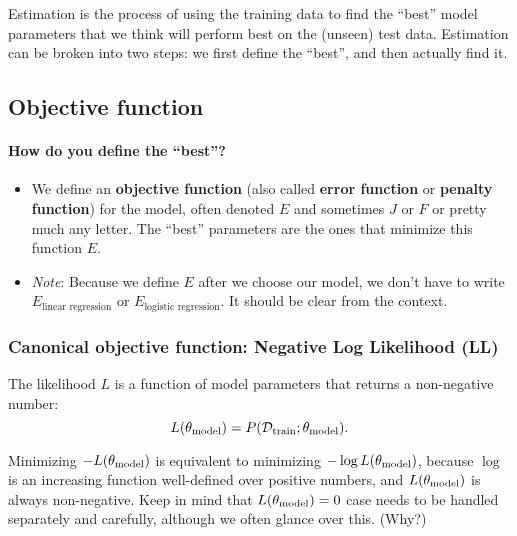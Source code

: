 \documentclass{discussion}
\providecommand{\tightlist}{%
\setlength{\itemsep}{2pt}\setlength{\parskip}{0pt}}
\begin{document}
Estimation is the process of using the training data to find the
``best'' model parameters that we think will perform best on the
(unseen) test data. Estimation can be broken into two steps: we first
define the ``best'', and then actually find it.

\subsection{Objective function}\label{objective-function}

\paragraph{How do you define the
``best''?}
\label{how-do-you-define-the-best}

\begin{itemize}
\tightlist
\item
  We define an \textbf{objective function} (also called \textbf{error
  function} or \textbf{penalty function}) for the model, often denoted
  \(E\) and sometimes \(J\) or \(F\) or pretty much any letter. The
  ``best'' parameters are the ones that minimize this function \(E\).
\item
  \emph{Note}: Because we define \(E\) after we choose our model, we
  don't have to write \(E_{\text{linear regression}}\) or
  \(E_{\text{logistic regression}}\). It should be clear from the
  context.
\end{itemize}



\subsubsection{Canonical objective function: Negative Log Likelihood
(LL)}\label{example-objective-function-negative-log-likelihood-ll}

  The likelihood \(L\) is a function of model parameters that returns a
  non-negative number: \[L(\mathbf{\theta}_{\text{model}}) = P(\mathcal{D}_{\mathrm{train}}; \mathbf{\theta}_{\text{model}}).\]

   Minimizing \(-L(\mathbf{\theta}_{\text{model}})\) is equivalent to minimizing \(-\log L(\mathbf{\theta}_{\text{model}})\),
  because \(\log\) is an increasing function well-defined over positive
  numbers, and \(L(\mathbf{\theta}_{\text{model}})\) is always non-negative. Keep in mind that \(L(\mathbf{\theta}_{\text{model}}) = 0\) case needs to be   handled separately and carefully, although we often glance over this. (Why?)
\end{document}
